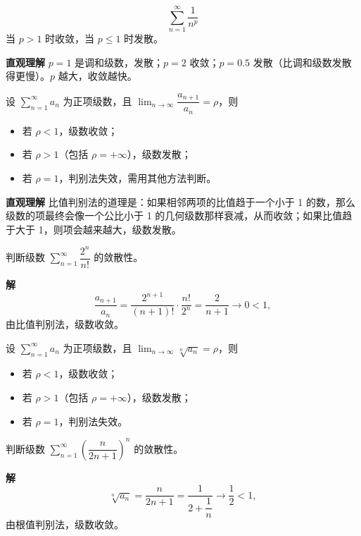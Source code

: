 \documentclass{ctexart}
\newenvironment{custom}[1]{\par\noindent \textbf{#1}\quad}{\par\vspace{1em}}
\begin{document}
\begin{example}[加减结构中的错误示例]
\begin{theorem}[\(p\)-级数]
\[
\sum_{n=1}^{\infty} \dfrac{1}{n^p}
\]
当 \(p > 1\) 时收敛，当 \(p \leq 1\) 时发散。
\end{theorem}

\begin{custom}{直观理解}
\(p=1\) 是调和级数，发散；\(p=2\) 收敛；\(p=0.5\) 发散（比调和级数发散得更慢）。\(p\) 越大，收敛越快。
\end{custom}

\begin{theorem}
设 \(\sum_{n=1}^{\infty} a_n\) 为正项级数，且 \(\lim_{n\to\infty} \dfrac{a_{n+1}}{a_n} = \rho\)，则
\begin{itemize}
\item 若 \(\rho < 1\)，级数收敛；
\item 若 \(\rho > 1\)（包括 \(\rho = +\infty\)），级数发散；
\item 若 \(\rho = 1\)，判别法失效，需用其他方法判断。
\end{itemize}
\end{theorem}

\begin{custom}{直观理解}
比值判别法的道理是：如果相邻两项的比值趋于一个小于 1 的数，那么级数的项最终会像一个公比小于 1 的几何级数那样衰减，从而收敛；如果比值趋于大于 1，则项会越来越大，级数发散。
\end{custom}

\begin{example}
判断级数 \(\sum_{n=1}^{\infty} \dfrac{2^n}{n!}\) 的敛散性。
\end{example}
\begin{custom}{解}
\[
\dfrac{a_{n+1}}{a_n} = \dfrac{2^{n+1}}{(n+1)!} \cdot \dfrac{n!}{2^n} = \dfrac{2}{n+1} \to 0 < 1,
\]
由比值判别法，级数收敛。
\end{custom}

\begin{theorem}
设 \(\sum_{n=1}^{\infty} a_n\) 为正项级数，且 \(\lim_{n\to\infty} \sqrt[n]{a_n} = \rho\)，则
\begin{itemize}
\item 若 \(\rho < 1\)，级数收敛；
\item 若 \(\rho > 1\)（包括 \(\rho = +\infty\)），级数发散；
\item 若 \(\rho = 1\)，判别法失效。
\end{itemize}
\end{theorem}

\begin{example}
判断级数 \(\sum_{n=1}^{\infty} \left(\dfrac{n}{2n+1}\right)^n\) 的敛散性。
\end{example}
\begin{custom}{解}
\[
\sqrt[n]{a_n} = \dfrac{n}{2n+1} = \dfrac{1}{2 + \dfrac{1}{n}} \to \dfrac{1}{2} < 1,
\]
由根值判别法，级数收敛。
\end{custom}


\end{example}
\end{document}
